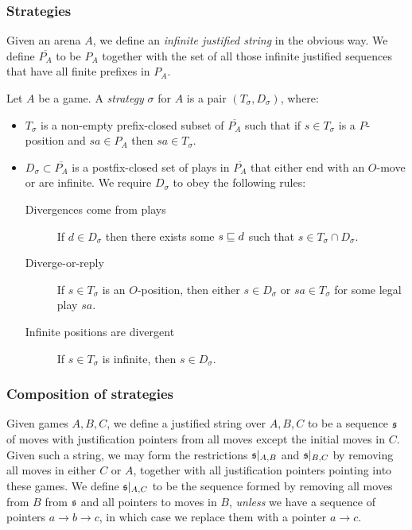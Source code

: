 \documentclass[sigplan,10pt,review]{acmart}\settopmatter{printfolios=true,printccs=false,printacmref=false}
\begin{document}
\subsubsection{Strategies}

Given an arena $A$, we define an \emph{infinite justified string} in the obvious way.  
We define $\overline{P_A}$ to be $P_A$ together with the set of all those infinite justified sequences that have all finite prefixes in $P_A$.

Let $A$ be a game.  
A \emph{strategy} $\sigma$ for $A$ is a pair $(T_\sigma,D_\sigma)$, where:
\begin{itemize}
  \item $T_\sigma$ is a non-empty prefix-closed subset of $\overline{P_A}$ such that if $s\in T_\sigma$ is a $P$-position and $sa\in P_A$ then $sa\in T_\sigma$.
  \item $D_\sigma\subset \overline{P_A}$ is a postfix-closed set of plays in $\overline{P_A}$ that either end with an $O$-move or are infinite.  
    We require $D_\sigma$ to obey the following rules:
    \begin{description}
      \item[Divergences come from plays] If $d\in D_\sigma$ then there exists some $s\sqsubseteq d$ such that $s\in T_\sigma\cap D_\sigma$.
      \item[Diverge-or-reply] If $s\in T_\sigma$ is an $O$-position, then either $s\in D_\sigma$ or $sa\in T_\sigma$ for some legal play $sa$.
      \item[Infinite positions are divergent] If $s\in T_\sigma$ is infinite, then $s\in D_\sigma$.
    \end{description}
\end{itemize}

\subsubsection{Composition of strategies}

Given games $A,B,C$, we define a justified string over $A,B,C$ to be a sequence $\mathfrak s$ of moves with justification pointers from all moves except the initial moves in $C$.  
Given such a string, we may form the restrictions $\mathfrak s\vert_{A,B}$ and $\mathfrak s\vert_{B,C}$ by removing all moves in either $C$ or $A$, together with all justification pointers pointing into these games.  
We define $\mathfrak s\vert_{A,C}$ to be the sequence formed by removing all moves from $B$ from $\mathfrak s$ and all pointers to moves in $B$, \emph{unless} we have a sequence of pointers $a \to b \to c$, in which case we replace them with a pointer $a \to c$.
\end{document}
